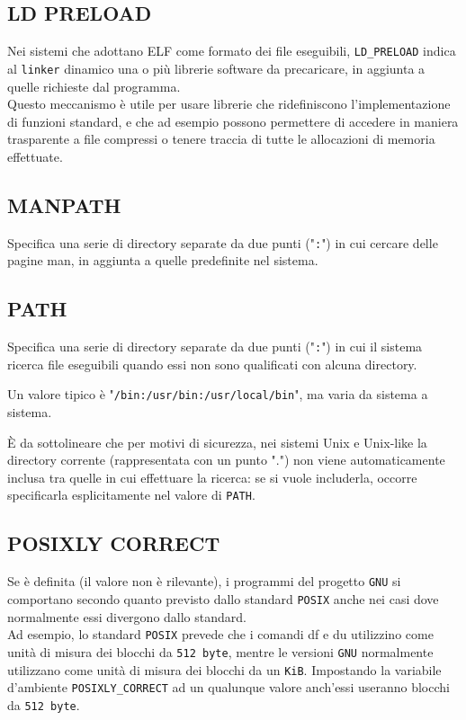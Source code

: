 \documentclass[11pt]{book}
\begin{document}
\subsection{LD PRELOAD}
Nei sistemi che adottano ELF come formato dei file eseguibili, \verb*|LD_PRELOAD| indica al \verb*|linker| dinamico una o più librerie software da precaricare, in aggiunta a quelle richieste dal programma.\\
Questo meccanismo è utile per usare librerie che ridefiniscono l'implementazione di funzioni standard, e che ad esempio possono permettere di accedere in maniera trasparente a file compressi o tenere traccia di tutte le allocazioni di memoria effettuate. 

\subsection{MANPATH}
Specifica una serie di directory separate da due punti ("\verb|:|") in cui cercare delle pagine man, in aggiunta a quelle predefinite nel sistema. 

\subsection{PATH}
Specifica una serie di directory separate da due punti ("\verb*|:|") in cui il sistema ricerca file eseguibili quando essi non sono qualificati con alcuna directory.

Un valore tipico è "\verb*|/bin:/usr/bin:/usr/local/bin|", ma varia da sistema a sistema.

È da sottolineare che per motivi di sicurezza, nei sistemi Unix e Unix-like la directory corrente (rappresentata con un punto ".") non viene automaticamente inclusa tra quelle in cui effettuare la ricerca: se si vuole includerla, occorre specificarla esplicitamente nel valore di \verb*|PATH|. 

\subsection{POSIXLY CORRECT}

Se è definita (il valore non è rilevante), i programmi del progetto \verb*|GNU| si comportano secondo quanto previsto dallo standard \verb*|POSIX| anche nei casi dove normalmente essi divergono dallo standard.\\
Ad esempio, lo standard \verb*|POSIX| prevede che i comandi df e du utilizzino come unità di misura dei blocchi da \verb*|512 byte|, mentre le versioni \verb*|GNU| normalmente utilizzano come unità di misura dei blocchi da un \verb*|KiB|. Impostando la variabile d'ambiente \verb*|POSIXLY_CORRECT| ad un qualunque valore anch'essi useranno blocchi da \verb*|512 byte|.
\end{document}
